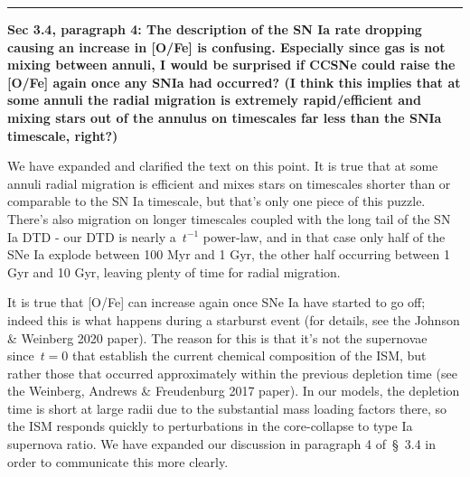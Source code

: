\documentclass{report}
\newcommand{\breakline}{\noindent\rule{\textwidth}{1pt}}
\begin{document}
\par\null\par 
\breakline 
\par\null\par 
\textbf{ 
	Sec 3.4, paragraph 4: The description of the SN Ia rate dropping causing an 
	increase in [O/Fe] is confusing. 
	Especially since gas is not mixing between annuli, I would be surprised if 
	CCSNe could raise the [O/Fe] again once any SNIa had occurred? 
	(I think this implies that at some annuli the radial migration is extremely 
	rapid/efficient and mixing stars out of the annulus on timescales far less 
	than the SNIa timescale, right?) 
} 
\par 
We have expanded and clarified the text on this point. 
It is true that at some annuli radial migration is efficient and mixes stars 
on timescales shorter than or comparable to the SN Ia timescale, but that's 
only one piece of this puzzle. 
There's also migration on longer timescales coupled with the long tail of the 
SN Ia DTD - our DTD is nearly a~$t^{-1}$ power-law, and in that case only half 
of the SNe Ia explode between 100 Myr and 1 Gyr, the other half occurring 
between 1 Gyr and 10 Gyr, leaving plenty of time for radial migration. 
\par 
It is true that [O/Fe] can increase again once SNe Ia have started to go 
off; indeed this is what happens during a starburst event (for details, see the 
Johnson \& Weinberg 2020 paper). 
The reason for this is that it's not the supernovae since~$t = 0$ that 
establish the current chemical composition of the ISM, but rather those that 
occurred approximately within the previous depletion time (see the Weinberg, 
Andrews \& Freudenburg 2017 paper). 
In our models, the depletion time is short at large radii due to the 
substantial mass loading factors there, so the ISM responds quickly to 
perturbations in the core-collapse to type Ia supernova ratio. 
We have expanded our discussion in paragraph 4 of~\S~3.4 in order to 
communicate this more clearly. 
\end{document}
